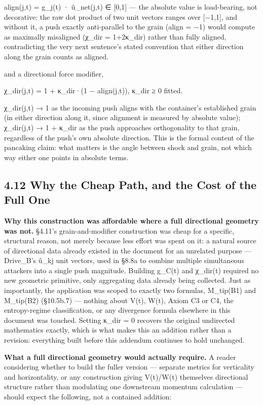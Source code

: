 \documentclass[
]{article}
\begin{document}
align(j,t) = \textbar g\_j(t) · û\_net(j,t)\textbar{} ∈ {[}0,1{]} ---
the absolute value is load-bearing, not decorative: the raw dot product
of two unit vectors ranges over {[}−1,1{]}, and without it, a push
exactly anti-parallel to the grain (align = −1) would compute as
maximally misaligned (χ\_dir = 1+2κ\_dir) rather than fully aligned,
contradicting the very next sentence's stated convention that either
direction along the grain counts as aligned.

and a directional force modifier,

χ\_dir(j,t) = 1 + κ\_dir·(1 − align(j,t)), κ\_dir ≥ 0 fitted.

χ\_dir(j,t) → 1 as the incoming push aligns with the container's
established grain (in either direction along it, since alignment is
measured by absolute value); χ\_dir(j,t) → 1 + κ\_dir as the push
approaches orthogonality to that grain, regardless of the push's own
absolute direction. This is the formal content of the pancaking claim:
what matters is the angle between shock and grain, not which way either
one points in absolute terms.

\hypertarget{why-the-cheap-path-and-the-cost-of-the-full-one}{%
\subsection{4.12 Why the Cheap Path, and the Cost of the Full
One}\label{why-the-cheap-path-and-the-cost-of-the-full-one}}

\textbf{Why this construction was affordable where a full directional
geometry was not.} §4.11's grain-and-modifier construction was cheap for
a specific, structural reason, not merely because less effort was spent
on it: a natural source of directional data already existed in the
document for an unrelated purpose --- Drive\_B's û\_kj unit vectors,
used in §8.8a to combine multiple simultaneous attackers into a single
push magnitude. Building g\_C(t) and χ\_dir(t) required no new geometric
primitive, only aggregating data already being collected. Just as
importantly, the application was scoped to exactly two formulas,
M\_tip(B1) and M\_tip(B2) (§10.5b.7) --- nothing about V(t), W(t), Axiom
C3 or C4, the entropy-regime classification, or any divergence formula
elsewhere in this document was touched. Setting κ\_dir = 0 recovers the
original undirected mathematics exactly, which is what makes this an
addition rather than a revision: everything built before this addendum
continues to hold unchanged.

\textbf{What a full directional geometry would actually require.} A
reader considering whether to build the fuller version --- separate
metrics for verticality and horizontality, or any construction giving
V(t)/W(t) themselves directional structure rather than modulating one
downstream momentum calculation --- should expect the following, not a
contained addition:
\end{document}
